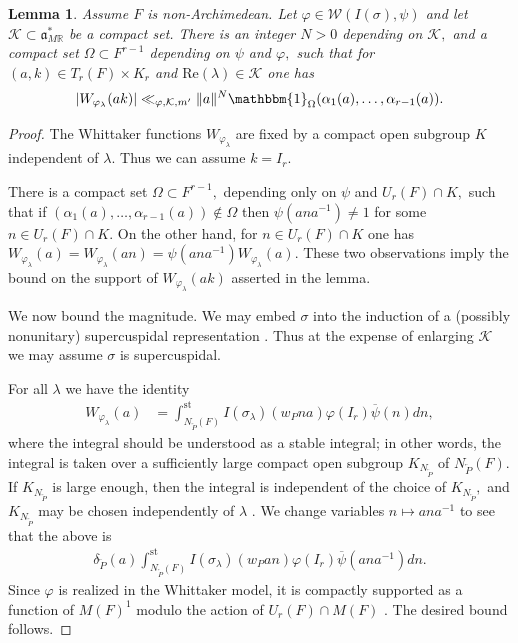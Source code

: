 \documentclass[12pt]{amsart}
\newtheorem{lem}[thm]{Lemma}
\theoremstyle{remark}
\numberwithin{equation}{section}
\newcommand{\RR}{\mathbb{R}}
\theoremstyle{definition}
\numberwithin{equation}{subsection}
\newcommand{\one}{\mathbbm{1}}
\newcommand{\norm}[1]{\lVert#1\rVert}
\begin{document}
\begin{lem} \label{lem:nonArch:Whitt:fam:bound}
Assume $F$ is non-Archimedean.  Let $\varphi \in \mathcal{W}(I(\sigma),\psi)$ and let $\mathcal{K} \subset \mathfrak{a}_{M\RR}^{*}$ be a compact set.  There is an integer $N>0$ depending on $\mathcal{K},$ and a compact set $\Omega \subset F^{r-1}$ depending on  $\psi$ and $\varphi,$ such that 
for $(a,k) \in  T_r(F) \times K_r$ and $\mathrm{Re}(\lambda) \in \mathcal{K}$
one has 
\begin{align*}
|W_{\varphi_\lambda}(ak)| \ll_{\varphi,\mathcal{K},m'} \norm{a}^{N}
\one_{\Omega}(\alpha_1(a),\dots,\alpha_{r-1}(a)).
\end{align*}
\end{lem}
\begin{proof}
 The Whittaker functions $W_{\varphi_\lambda}$ are fixed by a compact open subgroup $K$ independent of $\lambda.$  Thus we can assume $k=I_r.$  

  There is a compact set $\Omega \subset F^{r-1},$ depending only on $\psi$ and $U_r(F) \cap K,$  such that if $(\alpha_1(a),\dots,\alpha_{r-1}(a)) \not \in \Omega$ then  $\psi(ana^{-1}) \neq 1$  for some $n \in U_{r}(F) \cap K.$  On the other hand, for $n \in U_r(F) \cap K$ one has 
$W_{\varphi_{\lambda}}(a)=W_{\varphi_{\lambda}}(an)=\psi(ana^{-1})W_{\varphi_{\lambda}}(a).$  These two observations imply the bound on the support of $W_{\varphi_{\lambda}}(ak)$ asserted in the lemma.

We now bound the magnitude.  We may embed $\sigma$ into the induction of a (possibly nonunitary) supercuspidal representation \cite[Theorem 8.3.5]{Getz:Hahn}.  Thus at the expense of enlarging $\mathcal{K}$ we may assume $\sigma$ is supercuspidal.  
 
For all $\lambda$ we have the identity
\begin{align*}
W_{\varphi_{\lambda}}(a)&=\int_{N_{\overleftarrow{P}}(F)}^{\mathrm{st}}I(\sigma_\lambda)\left(w_Pna\right)\varphi(I_r) \overline{\psi}(n)dn,
\end{align*}
where the integral should be understood as a stable integral; in other words, the integral is taken over a sufficiently large compact open subgroup $K_{N_{\overleftarrow{P}}}$ of $N_{\overleftarrow{P}}(F).$  If $K_{N_{\overleftarrow{P}}}$ is large enough, then the integral is independent of the choice of $K_{N_{\overleftarrow{P}}},$ and $K_{N_{\overleftarrow{P}}}$ may be chosen independently of $\lambda$ \cite[\S 3.1]{CPS:derivatives}. We change variables $n \mapsto ana^{-1}$ to see that the above is 
\begin{align*}
\delta_{\overleftarrow{P}}(a)\int_{N_{\overleftarrow{P}}(F)}^{\mathrm{st}}I(\sigma_\lambda)\left(w_Pan\right)\varphi(I_r) \overline{\psi}(ana^{-1})dn.
\end{align*}
Since $\varphi$ is realized in the Whittaker model, it is compactly supported as a function of $M(F)^1$ modulo the action of $U_r(F) \cap M(F)$ \cite[Corollary 6.5]{CasselmanShalika}.  The desired bound follows.  
\end{proof}
\end{document}
